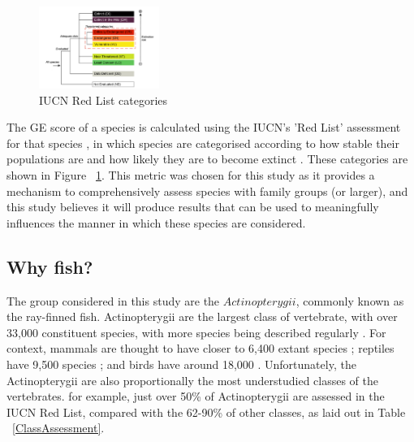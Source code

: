 \documentclass[11pt]{article}
\begin{document}
\begin{figure}
	
	\includegraphics[width=0.35\textwidth]{Images/RedListCategories.png}
	\caption{IUCN Red List categories \\  \autocite{IUCN2000} }
	\label{IUCNcategories}
	
\end{figure}

The GE score of a species is calculated using the IUCN's 'Red 
List' assessment for that species \autocite{Isaac2007}, in which species are 
categorised according to how stable their populations are and how likely they 
are to become extinct \autocite{IUCN2000}. These categories are shown in Figure 
~\ref{IUCNcategories}. This metric was chosen for this 
study as it provides a mechanism to comprehensively assess species with family 
groups (or larger), and this study believes it will produce results that can be 
used to meaningfully influences the manner in which these species are 
considered. 

\subsection{Why fish?}

The group considered in this study are the \(Actinopterygii\), commonly 
known as the ray-finned fish. Actinopterygii are the largest class of 
vertebrate, with over 33,000 constituent species, with more species being 
described regularly \autocite{Fishbase}. For 
context, mammals are thought to have closer to 6,400 extant species 
\autocite{Mammal2020}; reptiles have 9,500 species 
\autocite{Pincheira-Donoso2013}
; and birds have around 18,000 \autocite{Barrowclough2016}. Unfortunately, the 
Actinopterygii are also proportionally 
the most understudied classes of the vertebrates. for example, just over 50\% 
of Actinopterygii are assessed in the IUCN Red List, 
compared with the 62-90\% of other classes, as laid out in 
Table ~\ref{ClassAssessment}. \\
\end{document}
